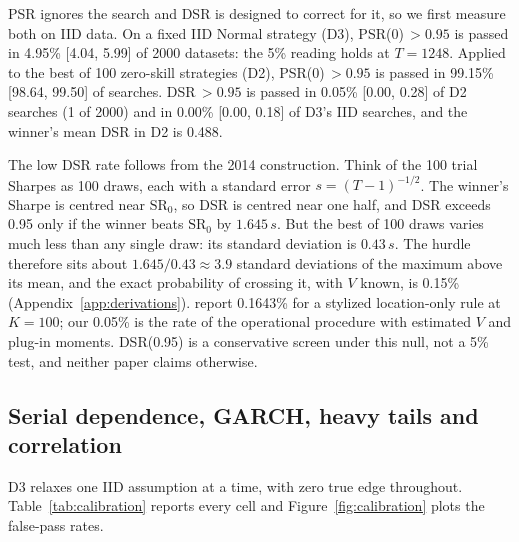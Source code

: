 \documentclass[11pt,a4paper]{article}
\newcommand{\SR}{\mathrm{SR}}
\begin{document}
PSR ignores the search and DSR is designed to correct for it, so we first measure both on IID data. On a fixed IID Normal strategy (D3), PSR(0)$\,>0.95$ is passed in 4.95\% [4.04, 5.99] of 2000 datasets: the 5\% reading holds at $T=1248$. Applied to the best of 100 zero-skill strategies (D2), PSR(0)$\,>0.95$ is passed in 99.15\% [98.64, 99.50] of searches. DSR$\,>0.95$ is passed in 0.05\% [0.00, 0.28] of D2 searches (1 of 2000) and in 0.00\% [0.00, 0.18] of D3's IID searches, and the winner's mean DSR in D2 is 0.488.

The low DSR rate follows from the 2014 construction. Think of the 100 trial Sharpes as 100 draws, each with a standard error $s=(T-1)^{-1/2}$. The winner's Sharpe is centred near $\SR_0$, so DSR is centred near one half, and DSR exceeds 0.95 only if the winner beats $\SR_0$ by $1.645\,s$. But the best of 100 draws varies much less than any single draw: its standard deviation is $0.43\,s$. The hurdle therefore sits about $1.645/0.43\approx3.9$ standard deviations of the maximum above its mean, and the exact probability of crossing it, with $V$ known, is 0.15\% (Appendix~\ref{app:derivations}). \citet[Exhibit~3, p.~11]{lopezdeprado2026porcu} report 0.1643\% for a stylized location-only rule at $K=100$; our 0.05\% is the rate of the operational procedure with estimated $V$ and plug-in moments. DSR(0.95) is a conservative screen under this null, not a 5\% test, and neither paper claims otherwise.

\subsection{Serial dependence, GARCH, heavy tails and correlation}\label{sec:res:calib}

D3 relaxes one IID assumption at a time, with zero true edge throughout. Table~\ref{tab:calibration} reports every cell and Figure~\ref{fig:calibration} plots the false-pass rates.
\end{document}
